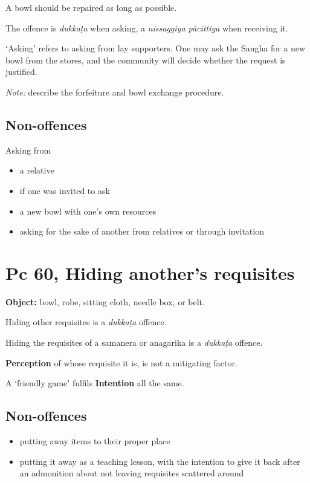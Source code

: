 A bowl should be repaired as long as possible.

The offence is \emph{dukkaṭa} when asking, a \emph{nissaggiya pācittiya}
when receiving it.

`Asking' refers to asking from lay supporters. One may ask the Sangha
for a new bowl from the stores, and the community will decide whether
the request is justified.

\emph{Note:} describe the forfeiture and bowl exchange procedure.

\subsection{Non-offences}

Asking from

\begin{itemize}
\tightlist
\item
  a relative
\item
  if one was invited to ask
\item
  a new bowl with one's own resources
\item
  asking for the sake of another from relatives or through invitation
\end{itemize}

\clearpage

\section{Pc 60, Hiding another's requisites}

\textbf{Object:} bowl, robe, sitting cloth, needle box, or belt.

Hiding other requisites is a \emph{dukkaṭa} offence.

Hiding the requisites of a samanera or anagarika is a \emph{dukkaṭa}
offence.

\textbf{Perception} of whose requisite it is, is not a mitigating
factor.

A `friendly game' fulfils \textbf{Intention} all the same.

\subsection{Non-offences}

\begin{itemize}
\tightlist
\item
  putting away items to their proper place
\item
  putting it away as a teaching lesson, with the intention to give it
  back after an admonition about not leaving requisites scattered around
\end{itemize}

